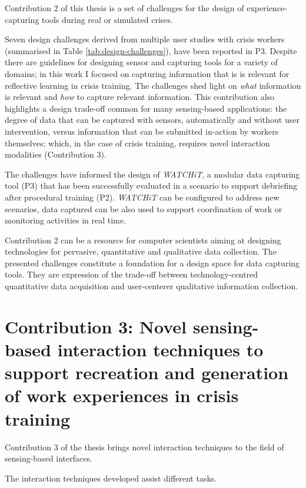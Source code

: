 Contribution 2 of this thesis is a set of challenges for the design of experience-capturing tools during real or simulated crises.

Seven design challenges derived from multiple user studies with crisis workers (summarised in Table \ref{tab:design-challenges}), have been reported in P3. Despite there are guidelines for designing sensor and capturing tools for a variety of domains; in this work I focused on capturing information that is is relevant for reflective learning in crisis training. The challenges shed light on \emph{what} information is relevant and \emph{how} to capture relevant information. This contribution also highlights a design trade-off common for many sensing-based applications: the degree of data that can be captured with sensors, automatically and without user intervention, versus information that can be submitted in-action by workers themselves; which, in the case of crisis training, requires novel interaction modalities (Contribution 3). 

The challenges have informed the design of \emph{WATCHiT}, a modular data capturing tool (P3) that has been successfully evaluated in a scenario to support debriefing after procedural training (P2). \emph{WATCHiT} can be configured to address new scenarios, data captured can be also used to support coordination of work or monitoring activities in real time.

Contribution 2 can be a resource for computer scientists aiming at designing technologies for pervasive, quantitative and qualitative data collection. The presented challenges constitute a foundation for a design space for data capturing tools. They are expression of the trade-off between technology-centred quantitative data acquisition and user-centerer qualitative information collection.

\section{Contribution 3: Novel sensing-based interaction techniques to support recreation and generation of work experiences in crisis training}\label{c3-novel-sensing-based-interaction-techniques-to-support-recreation-and-generation-of-work-experiences-in-crisis-training}

Contribution 3 of the thesis brings novel interaction techniques to the field of sensing-based interfaces.

The interaction techniques developed assist different tasks.

